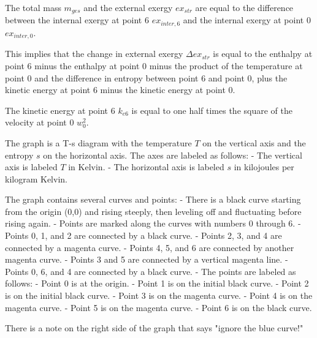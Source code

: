The total mass \( m_{ges} \) and the external exergy \( ex_{str} \) are equal to the difference between the internal exergy at point 6 \( ex_{inter,6} \) and the internal exergy at point 0 \( ex_{inter,0} \).

This implies that the change in external exergy \( \Delta ex_{str} \) is equal to the enthalpy at point 6 minus the enthalpy at point 0 minus the product of the temperature at point 0 and the difference in entropy between point 6 and point 0, plus the kinetic energy at point 6 minus the kinetic energy at point 0.

The kinetic energy at point 6 \( k_{e6} \) is equal to one half times the square of the velocity at point 0 \( w_0^2 \).

The graph is a T-s diagram with the temperature \( T \) on the vertical axis and the entropy \( s \) on the horizontal axis. The axes are labeled as follows:
- The vertical axis is labeled \( T \) in Kelvin.
- The horizontal axis is labeled \( s \) in kilojoules per kilogram Kelvin.

The graph contains several curves and points:
- There is a black curve starting from the origin (0,0) and rising steeply, then leveling off and fluctuating before rising again.
- Points are marked along the curves with numbers 0 through 6.
- Points 0, 1, and 2 are connected by a black curve.
- Points 2, 3, and 4 are connected by a magenta curve.
- Points 4, 5, and 6 are connected by another magenta curve.
- Points 3 and 5 are connected by a vertical magenta line.
- Points 0, 6, and 4 are connected by a black curve.
- The points are labeled as follows:
  - Point 0 is at the origin.
  - Point 1 is on the initial black curve.
  - Point 2 is on the initial black curve.
  - Point 3 is on the magenta curve.
  - Point 4 is on the magenta curve.
  - Point 5 is on the magenta curve.
  - Point 6 is on the black curve.

There is a note on the right side of the graph that says "ignore the blue curve!"